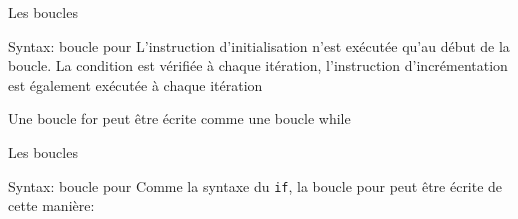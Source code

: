 \documentclass{beamer}
\begin{document}
\begin{darkframes}
	\begin{frame}{Les boucles}	
		\begin{block}{Syntax: boucle pour}
			\forsyntax
			L'instruction \alert{d'initialisation } n'est exécutée qu'au début de la boucle. La \alert{condition} est vérifiée à chaque itération, \alert{l'instruction d'incrémentation} est également exécutée à chaque itération
		\end{block}
		\begin{alertblock}{Une boucle for peut être écrite comme une boucle while}
			\forWrittenUsingWhile
		\end{alertblock}
	\end{frame}



	\begin{frame}{Les boucles}
		\begin{block}{Syntax: boucle pour}
			Comme la syntaxe du \texttt{if}, la boucle pour peut être écrite de cette manière:
			\forsyntaxtwo
		\end{block}
		\begin{center}
			\begin{minipage}[t]{0.48\linewidth}
				\forExmpOne
			\end{minipage}
			\begin{minipage}[t]{0.48\linewidth}
				\forExmpTwo
			\end{minipage}
		\end{center}
	\end{frame}
	




\end{darkframes}
\end{document}
